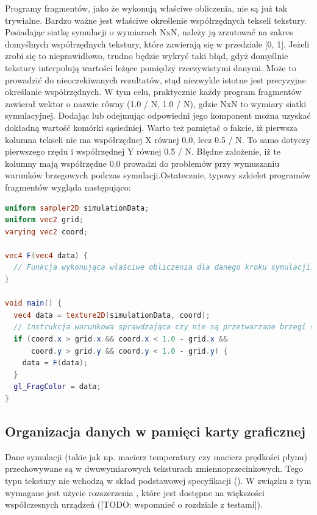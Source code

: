 Programy fragmentów, jako że wykonują właściwe obliczenia, nie są już tak
trywialne. Bardzo ważne jest właściwe określenie współrzędnych tekseli tekstury.
Posiadając siatkę symulacji o wymiarach NxN, należy ją zrzutować na zakres
domyślnych współrzędnych tekstury, które zawierają się w przedziale [0, 1].
Jeżeli zrobi się to nieprawidłowo, trudno będzie wykryć taki błąd, gdyż
domyślnie tekstury interpolują wartości leżące pomiędzy rzeczywistymi danymi.
Może to prowadzić do nieoczekiwanych rezultatów, stąd niezwykle istotne jest
precyzyjne określanie współrzędnych. W tym celu, praktycznie każdy program
fragmentów zawierał wektor o nazwie  równy (1.0 / N, 1.0 / N), gdzie
NxN to wymiary siatki symulacyjnej. Dodając lub odejmując odpowiedni jego
komponent można uzyskać dokładną wartość komórki sąsiedniej. Warto też pamiętać
o fakcie, iż pierwsza kolumna tekseli nie ma współrzędnej X równej 0.0, lecz 0.5
/ N. To samo dotyczy pierwszego rzędu i współrzędnej Y równej 0.5 / N. Błędne
założenie, iż te kolumny mają współrzędne 0.0 prowadzi do problemów przy
wymuszaniu warunków brzegowych podczas symulacji.Ostatecznie, typowy szkielet
programów fragmentów wygląda następująco:

\begin{lstlisting}[language=GLSL, caption=Szkielet implementacji programu
fragmentów w symulatorze \ow{Energy2D} (język GLSL)]
uniform sampler2D simulationData;
uniform vec2 grid;
varying vec2 coord;

vec4 F(vec4 data) {
  // Funkcja wykonująca właściwe obliczenia dla danego kroku symulacji.
}

void main() {
  vec4 data = texture2D(simulationData, coord);
  // Instrukcja warunkowa sprawdzająca czy nie są przetwarzane brzegi siatki.
  if (coord.x > grid.x && coord.x < 1.0 - grid.x &&
      coord.y > grid.y && coord.y < 1.0 - grid.y) {
    data = F(data);
  }
  gl_FragColor = data;
}
\end{lstlisting}

\subsection{Organizacja danych w pamięci karty graficznej}
\label{sec:orgDanychWGPU}
Dane symulacji (takie jak np. macierz temperatury czy macierz prędkości płynu)
przechowywane są w dwuwymiarowych teksturach zmiennoprzecinkowych. Tego typu
tekstury nie wchodzą w skład podstawowej specyfikacji 
(\cite{WebGLSpec}). W związku z tym wymagane jest użycie rozszerzenia
, które jest dostępne na większości
współczesnych urządzeń ([TODO: wspomnieć o rozdziale z testami]).

